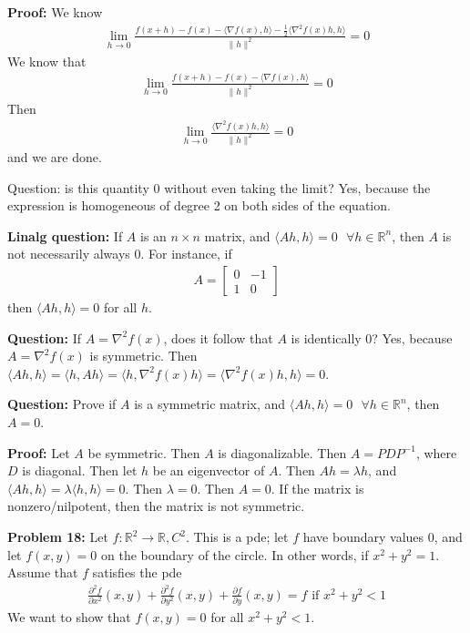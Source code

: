 \documentclass{article}
\newcommand*{\txt}[1]{\text{ #1 }}%
\newcommand*{\iprod}[1]{\langle #1 \rangle}
\newcommand*{\fora}{\txt{}\forall}%
\newcommand*{\rr}{\mathbb{R}}%
\begin{document}
\textbf{Proof:} We know \begin{align*}
    \lim_{h\to 0}\frac{f(x+h)-f(x)-\iprod{\nabla f(x),h}-\frac{1}{2}\iprod{\nabla^2f(x)h,h}}{\|h\|^2}=0
\end{align*} We know that \begin{align*}
    \lim_{h\to 0}\frac{f(x+h)-f(x)-\iprod{\nabla f(x),h}}{\|h\|^2}=0
\end{align*} Then \begin{align*}
    \lim_{h\to 0}\frac{\iprod{\nabla^2 f(x)h,h}}{\|h\|^2}=0
\end{align*} and we are done.

Question: is this quantity 0 without even taking the limit? Yes, because the expression is homogeneous of degree 2 on both sides of the equation.

\textbf{Linalg question:} If $A$ is an $n\times n$ matrix, and $\iprod{Ah,h}=0\fora h\in \rr^n$, then $A$ is not necessarily always 0. For instance, if \begin{align*}
    A=\begin{bmatrix}
        0 & -1\\
        1 & 0
    \end{bmatrix}
\end{align*} then $\iprod{Ah,h}=0$ for all $h$.

\textbf{Question:} If $A=\nabla^2 f(x)$, does it follow that $A$ is identically 0? Yes, because $A=\nabla^2 f(x)$ is symmetric. Then $\iprod{Ah,h}=\iprod{h,Ah}=\iprod{h,\nabla^2 f(x)h}=\iprod{\nabla^2 f(x)h,h}=0$.

\textbf{Question:} Prove if $A$ is a symmetric matrix, and $\iprod{Ah,h}=0\fora h\in \rr^n$, then $A=0$.

\textbf{Proof:} Let $A$ be symmetric. Then $A$ is diagonalizable. Then $A=PDP^{-1}$, where $D$ is diagonal. Then let $h$ be an eigenvector of $A$. Then $Ah=\lambda h$, and $\iprod{Ah,h}=\lambda\iprod{h,h}=0$. Then $\lambda=0$. Then $A=0$. If the matrix is nonzero/nilpotent, then the matrix is not symmetric.

\textbf{Problem 18:} Let $f:\rr^2\to \rr, C^2$. This is a pde; let $f$ have boundary values 0, and let $f(x,y)=0$ on the boundary of the circle. In other words, if $x^2+y^2=1$. Assume that $f$ satisfies the pde \begin{align*}
    \frac{\partial^2 f}{\partial x^2}(x,y)+\frac{\partial^2 f}{\partial y^2}(x,y)+\frac{\partial f}{\partial y}(x,y)=f\txt{if}x^2+y^2<1
\end{align*} We want to show that $f(x,y)=0$ for all $x^2+y^2<1$.
\end{document}
